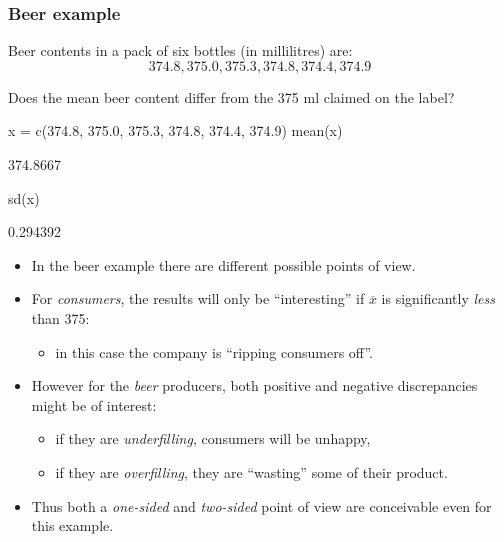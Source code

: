 \documentclass[a4paper]{article}
\begin{document}
\subsubsection{Beer example}
Beer contents in a pack of six bottles (in millilitres) are:
\[
	374.8, 375.0, 375.3, 374.8, 374.4, 374.9
\]
\begin{goldbox}
	Does the mean beer content differ from the 375 ml claimed on the label?
\end{goldbox}
\begin{Schunk}
\begin{Sinput}
x = c(374.8, 375.0, 375.3, 374.8, 374.4, 374.9)
mean(x)
\end{Sinput}
\begin{Soutput}
[1] 374.8667
\end{Soutput}
\begin{Sinput}
sd(x)
\end{Sinput}
\begin{Soutput}
[1] 0.294392
\end{Soutput}
\end{Schunk}
\begin{itemize}
	\item In the beer example there are different possible points of view.
	\item For \textit{consumers}, the results will only be ``interesting'' if \( \overline{x} \) is significantly \textit{less} than 375:
	\begin{itemize}
		\item in this case the company is ``ripping consumers off''.
	\end{itemize}
	\item However for the \textit{beer} producers, both positive and negative discrepancies might be of interest:
	\begin{itemize}
		\item if they are \textit{underfilling}, consumers will be unhappy,
		\item if they are \textit{overfilling}, they are ``wasting'' some of their product.
	\end{itemize}
	\item Thus both a \textit{one-sided} and \textit{two-sided} point of view are conceivable even for this example.
\end{itemize}
\end{document}
